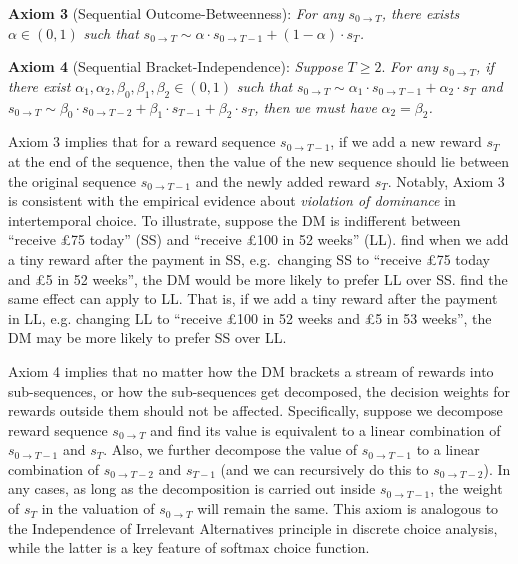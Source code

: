 \documentclass[
  12pt,
]{article}
\begin{document}
\noindent \textbf{Axiom 3} (Sequential Outcome-Betweenness): \emph{For
any} \(s_{0\rightarrow T}\)\emph{, there exists} \(\alpha\in(0,1)\)
\emph{such that}
\(s_{0\rightarrow T} \sim \alpha\cdot s_{0\rightarrow T-1}+(1-\alpha) \cdot s_T\)\emph{.}

\noindent \textbf{Axiom 4} (Sequential Bracket-Independence):
\emph{Suppose} \(T\geq 2\). \emph{For any} \(s_{0\rightarrow T}\)\emph{,
if there exist} \(\alpha_1,\alpha_2,\beta_0,\beta_1,\beta_2\in(0,1)\)
\emph{such that}
\(s_{0\rightarrow T}\sim \alpha_1 \cdot s_{0\rightarrow T-1} + \alpha_2 \cdot s_{T}\)
\emph{and}
\(s_{0\rightarrow T}\sim \beta_0 \cdot s_{0\rightarrow T-2}+\beta_1 \cdot s_{T-1}+\beta_2 \cdot s_{T}\)\emph{,
then we must have} \(\alpha_2 = \beta_2\)\emph{.}

Axiom 3 implies that for a reward sequence \(s_{0\rightarrow T-1}\), if
we add a new reward \(s_T\) at the end of the sequence, then the value
of the new sequence should lie between the original sequence
\(s_{0\rightarrow T-1}\) and the newly added reward \(s_T\). Notably,
Axiom 3 is consistent with the empirical evidence about \emph{violation
of dominance} \citep{scholten2014better, jiang2017better} in
intertemporal choice. To illustrate, suppose the DM is indifferent
between ``receive £75 today'' (SS) and ``receive £100 in 52 weeks''
(LL). \citet{scholten2014better} find when we add a tiny reward after
the payment in SS, e.g.~changing SS to ``receive £75 today and £5 in 52
weeks'', the DM would be more likely to prefer LL over SS.
\citet{jiang2017better} find the same effect can apply to LL. That is,
if we add a tiny reward after the payment in LL, e.g. changing LL to
``receive £100 in 52 weeks and £5 in 53 weeks'', the DM may be more
likely to prefer SS over LL.

Axiom 4 implies that no matter how the DM brackets a stream of rewards
into sub-sequences, or how the sub-sequences get decomposed, the
decision weights for rewards outside them should not be affected.
Specifically, suppose we decompose reward sequence
\(s_{0\rightarrow T}\) and find its value is equivalent to a linear
combination of \(s_{0\rightarrow T-1}\) and \(s_T\). Also, we further
decompose the value of \(s_{0\rightarrow T-1}\) to a linear combination
of \(s_{0\rightarrow T-2}\) and \(s_{T-1}\) (and we can recursively do
this to \(s_{0\rightarrow T-2}\)). In any cases, as long as the
decomposition is carried out inside \(s_{0\rightarrow T-1}\), the weight
of \(s_T\) in the valuation of \(s_{0\rightarrow T}\) will remain the
same. This axiom is analogous to the Independence of Irrelevant
Alternatives principle in discrete choice analysis, while the latter is
a key feature of softmax choice function.
\end{document}
